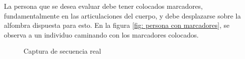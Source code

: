 La persona que se desea evaluar debe tener colocados marcadores, fundamentalmente en las articulaciones del cuerpo, y debe desplazarse sobre la alfombra dispuesta para esto. En la figura \ref{fig: persona con marcadores}, se observa a un individuo caminando con los marcadores colocados.

\begin{figure}[H]
        \centering
        
        \hspace{0.2cm}
  \caption{Captura de secuencia real}
      \label{fig: captura real}
\end{figure}


